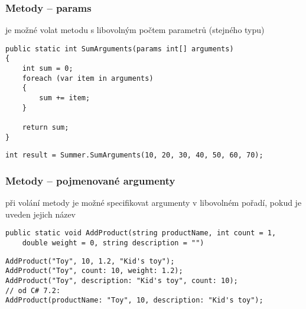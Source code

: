 \nezkouskove

\begin{frame}[fragile]
\frametitle{Metody -- params}
\begin{bitemize}{}
\item je možné volat metodu s libovolným počtem parametrů (stejného typu)
\end{bitemize}

\begin{yesblock}
\begin{lstlisting}[basicstyle=\small]
public static int SumArguments(params int[] arguments)
{
    int sum = 0;
    foreach (var item in arguments)
    {
        sum += item;
    }

    return sum;
}
\end{lstlisting}
\end{yesblock}
\vskip -2mm
\begin{yesblock}
\begin{lstlisting}[basicstyle=\small]
int result = Summer.SumArguments(10, 20, 30, 40, 50, 60, 70);
\end{lstlisting}
\end{yesblock}
\end{frame}





\begin{frame}[fragile]
\frametitle{Metody -- pojmenované argumenty}
\begin{bitemize}{}
\item při volání metody je možné specifikovat argumenty v libovolném pořadí, pokud je uveden jejich název
\end{bitemize}

\begin{yesblock}
\begin{lstlisting}[basicstyle=\small]
public static void AddProduct(string productName, int count = 1, 
    double weight = 0, string description = "")
\end{lstlisting}
\end{yesblock}

\begin{yesblock}
\begin{lstlisting}[basicstyle=\small]
AddProduct("Toy", 10, 1.2, "Kid's toy");
AddProduct("Toy", count: 10, weight: 1.2);
AddProduct("Toy", description: "Kid's toy", count: 10);
// od C# 7.2:
AddProduct(productName: "Toy", 10, description: "Kid's toy"); 
\end{lstlisting}
\end{yesblock}
\end{frame}





